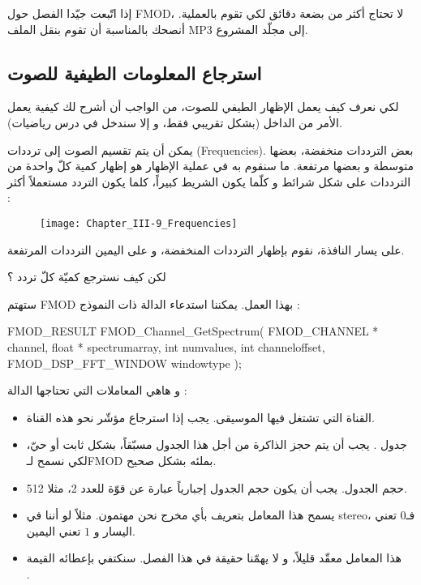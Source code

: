 إذا اتّبعت جيّدا الفصل حول
\textenglish{FMOD}،
لا تحتاج أكثر من بضعة دقائق لكي تقوم بالعملية. أنصحك بالمناسبة أن تقوم بنقل الملف
\textenglish{MP3}
إلى مجلّد المشروع.

\subsection{استرجاع المعلومات الطيفية للصوت}

لكي نعرف كيف يعمل الإظهار الطيفي للصوت، من الواجب أن أشرح لك كيفية يعمل الأمر من الداخل (بشكل تقريبي فقط، و إلا سندخل في درس رياضيات).

يمكن أن يتم تقسيم الصوت إلى ترددات 
(\textenglish{Frequencies}).
بعض الترددات منخفضة، بعضها متوسطة و بعضها مرتفعة. ما سنقوم به في عملية الإظهار هو إظهار كمية كلّ واحدة من الترددات على شكل شرائط و كلّما يكون الشريط كبيراً، كلما يكون التردد مستعملاً أكثر :

\begin{figure}[H]
	\centering
	\texttt{[image: Chapter\_III-9\_Frequencies]}
\end{figure}

على يسار النافذة، نقوم بإظهار الترددات المنخفضة، و على اليمين الترددات المرتفعة.

\begin{question}
لكن كيف نسترجع كميّة كلّ تردد ؟
\end{question}

ستهتم
\textenglish{FMOD}
بهذا العمل. يمكننا استدعاء الدالة
ذات النموذج :

\begin{Csource}
FMOD_RESULT FMOD_Channel_GetSpectrum(
	FMOD_CHANNEL *  channel,
	float *  spectrumarray,
	int  numvalues,
	int  channeloffset,
	FMOD_DSP_FFT_WINDOW  windowtype
);
\end{Csource}

و هاهي المعاملات التي تحتاجها الدالة :

\begin{itemize}
	\item القناة التي تشتغل فيها الموسيقى. يجب إذا استرجاع مؤشّر نحو هذه القناة.
	\item جدول
	.
	يجب أن يتم حجز الذاكرة من أجل هذا الجدول مسبّقاً، بشكل ثابت أو حيّ، لكي نسمح لـ\textenglish{FMOD}
	بملئه بشكل صحيح.
	\item حجم الجدول. يجب أن يكون حجم الجدول إجبارياً عبارة عن قوّة للعدد 2، مثلا 512.
	\item يسمح هذا المعامل بتعريف بأي مخرج نحن مهتمون. مثلاً لو أننا في
	\textenglish{stereo}،
	فـ$ 0 $ تعني اليسار و $ 1 $ تعني اليمين.
	\item هذا المعامل معقّد قليلاً، و لا يهمّنا حقيقة في هذا الفصل. سنكتفي بإعطائه القيمة\\ 
	.
\end{itemize}

